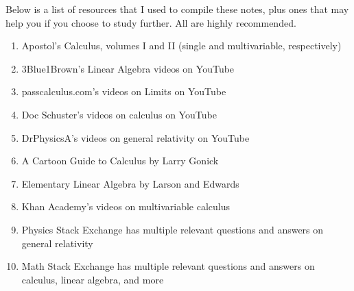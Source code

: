 Below is a list of resources that I used to compile these notes, plus ones that may help you if you choose to study further. All 
are highly recommended.
\begin{enumerate}
\item Apostol's Calculus, volumes I and II (single and multivariable, respectively)
\item 3Blue1Brown's Linear Algebra videos on YouTube
\item passcalculus.com's videos on Limits on YouTube
\item Doc Schuster's videos on calculus on YouTube
\item DrPhysicsA's videos on general relativity on YouTube
\item A Cartoon Guide to Calculus by Larry Gonick
\item Elementary Linear Algebra by Larson and Edwards
\item Khan Academy's videos on multivariable calculus
\item Physics Stack Exchange has multiple relevant questions and answers on general relativity
\item Math Stack Exchange has multiple relevant questions and answers on calculus, linear algebra, and more
\end{enumerate}
